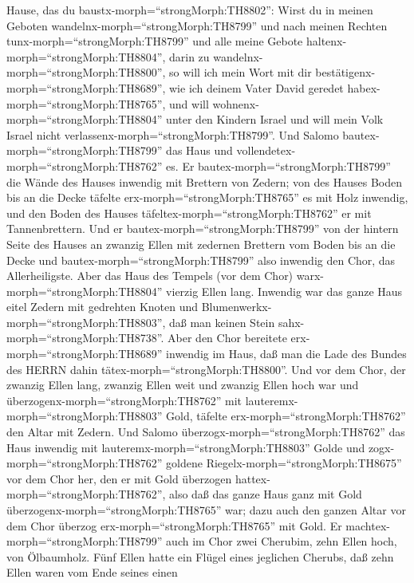 Hause, das du baustx-morph=``strongMorph:TH8802'': Wirst du in meinen
Geboten wandelnx-morph=``strongMorph:TH8799'' und nach meinen Rechten
tunx-morph=``strongMorph:TH8799'' und alle meine Gebote
haltenx-morph=``strongMorph:TH8804'', darin zu
wandelnx-morph=``strongMorph:TH8800'', so will ich mein Wort mit dir
bestätigenx-morph=``strongMorph:TH8689'', wie ich deinem Vater David
geredet habex-morph=``strongMorph:TH8765'',  und will
wohnenx-morph=``strongMorph:TH8804'' unter den Kindern Israel und will
mein Volk Israel nicht verlassenx-morph=``strongMorph:TH8799''.
 Und Salomo bautex-morph=``strongMorph:TH8799'' das Haus
und vollendetex-morph=``strongMorph:TH8762'' es.  Er
bautex-morph=``strongMorph:TH8799'' die Wände des Hauses inwendig mit
Brettern von Zedern; von des Hauses Boden bis an die Decke täfelte
erx-morph=``strongMorph:TH8765'' es mit Holz inwendig, und den Boden des
Hauses täfeltex-morph=``strongMorph:TH8762'' er mit Tannenbrettern.
 Und er bautex-morph=``strongMorph:TH8799'' von der hintern
Seite des Hauses an zwanzig Ellen mit zedernen Brettern vom Boden bis an
die Decke und bautex-morph=``strongMorph:TH8799'' also inwendig den
Chor, das Allerheiligste.  Aber das Haus des Tempels (vor
dem Chor) warx-morph=``strongMorph:TH8804'' vierzig Ellen lang.
 Inwendig war das ganze Haus eitel Zedern mit gedrehten
Knoten und Blumenwerkx-morph=``strongMorph:TH8803'', daß man keinen
Stein sahx-morph=``strongMorph:TH8738''.  Aber den Chor
bereitete erx-morph=``strongMorph:TH8689'' inwendig im Haus, daß man die
Lade des Bundes des HERRN dahin tätex-morph=``strongMorph:TH8800''.
 Und vor dem Chor, der zwanzig Ellen lang, zwanzig Ellen
weit und zwanzig Ellen hoch war und
überzogenx-morph=``strongMorph:TH8762'' mit
lauteremx-morph=``strongMorph:TH8803'' Gold, täfelte
erx-morph=``strongMorph:TH8762'' den Altar mit Zedern.  Und
Salomo überzogx-morph=``strongMorph:TH8762'' das Haus inwendig mit
lauteremx-morph=``strongMorph:TH8803'' Golde und
zogx-morph=``strongMorph:TH8762'' goldene
Riegelx-morph=``strongMorph:TH8675'' vor dem Chor her, den er mit Gold
überzogen hattex-morph=``strongMorph:TH8762'',  also daß
das ganze Haus ganz mit Gold überzogenx-morph=``strongMorph:TH8765''
war; dazu auch den ganzen Altar vor dem Chor überzog
erx-morph=``strongMorph:TH8765'' mit Gold.  Er
machtex-morph=``strongMorph:TH8799'' auch im Chor zwei Cherubim, zehn
Ellen hoch, von Ölbaumholz.  Fünf Ellen hatte ein Flügel
eines jeglichen Cherubs, daß zehn Ellen waren vom Ende seines einen
